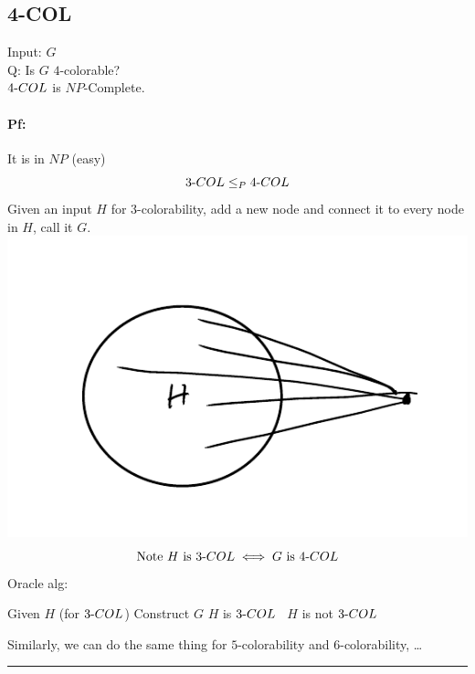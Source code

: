 \documentclass[12 pt]{article}
\begin{document}
          \subsection{4-COL}
          Input: $G$
          \\ Q: Is $G$ $4$-colorable?
          \\ $4\hbox{-}COL$ is $NP$-Complete.
          \paragraph{Pf:} It is in $NP$ (easy)
          $$3\hbox{-}COL \leq_P 4\hbox{-}COL$$
          Given an input $H$ for $3$-colorability, add a new node and
          connect it to every node in $H$, call it $G$.
          \\ \includegraphics[width=.9\textwidth]{i140.pdf}
          $$\text{Note }H \text{ is }3\hbox{-}COL \iff G \text{ is
          }4\hbox{-}COL$$
          Oracle alg:
          \begin{algorithmic}
            \State Given $H$ (for $3\hbox{-}COL$)
            \State Construct $G$
             $H$ is $3\hbox{-}COL$
            \Else \ $H$ is not $3\hbox{-}COL$
            \EndIf
          \end{algorithmic}
          Similarly, we can do the same thing for $5$-colorability and
          $6$-colorability, \ldots
          \\ \noindent \rule{\textwidth}{0.5pt}
\end{document}
